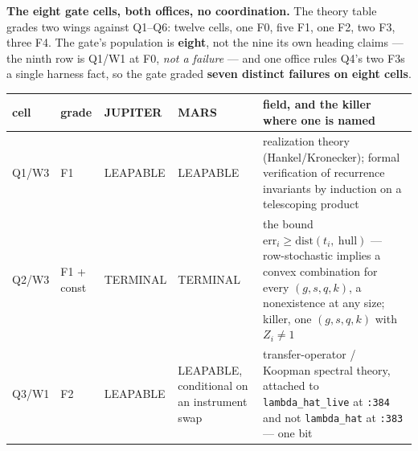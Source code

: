 \documentclass[11pt,a4paper]{article}
\newcounter{none}                 %
\theoremstyle{plain}
\theoremstyle{definition}
\theoremstyle{remark}
\begin{document}
\textbf{The eight gate cells, both offices, no coordination.} The theory
table grades two wings against Q1--Q6: twelve cells, one F0, five F1,
one F2, two F3, three F4. The gate's population is \textbf{eight}, not
the nine its own heading claims --- the ninth row is Q1/W1 at F0,
\emph{not a failure} --- and one office rules Q4's two F3s a single
harness fact, so the gate graded \textbf{seven distinct failures on
eight cells}.

{\def\LTcaptype{none} %
\begin{longtable}[]{@{}
  >{\raggedright\arraybackslash}p{}
  >{\raggedright\arraybackslash}p{}
  >{\raggedright\arraybackslash}p{}
  >{\raggedright\arraybackslash}p{}
  >{\raggedright\arraybackslash}p{}@{}}
\toprule\noalign{}
\begin{minipage}[b]{\linewidth}\raggedright
cell
\end{minipage} & \begin{minipage}[b]{\linewidth}\raggedright
grade
\end{minipage} & \begin{minipage}[b]{\linewidth}\raggedright
JUPITER
\end{minipage} & \begin{minipage}[b]{\linewidth}\raggedright
MARS
\end{minipage} & \begin{minipage}[b]{\linewidth}\raggedright
field, and the killer where one is named
\end{minipage} \\
\midrule\noalign{}
\endhead
\bottomrule\noalign{}
\endlastfoot
Q1/W3 & F1 & LEAPABLE & LEAPABLE & realization theory
(Hankel/Kronecker); formal verification of recurrence invariants by
induction on a telescoping product \\
Q2/W3 & F1 + const & TERMINAL & TERMINAL & the bound
\(\mathrm{err}_i\ge\mathrm{dist}(t_i,\ \mathrm{hull})\) ---
row-stochastic implies a convex combination for every \((g,s,q,k)\), a
nonexistence at any size; killer, one \((g,s,q,k)\) with \(Z_i\ne 1\) \\
Q3/W1 & F2 & LEAPABLE & LEAPABLE, conditional on an instrument swap &
transfer-operator / Koopman spectral theory, attached to
\texttt{lambda\_hat\_live} at \texttt{:384} and not \texttt{lambda\_hat}
at \texttt{:383} --- one bit \\

\end{longtable}}
\end{document}
